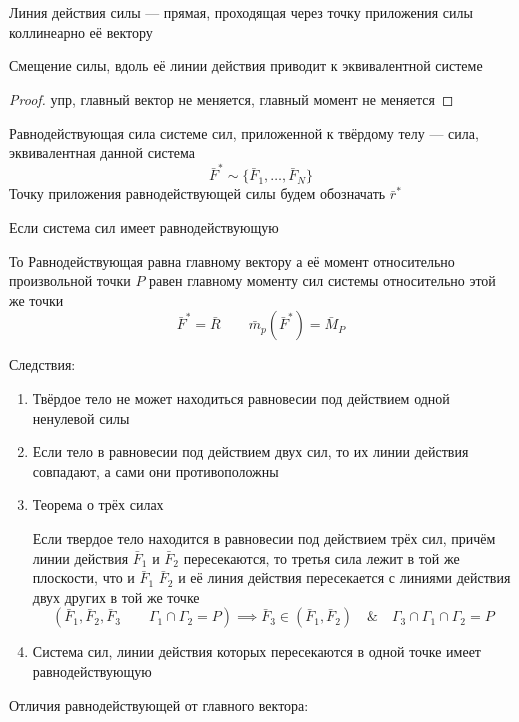 \documentclass[crop=false]{standalone}
\begin{document}
\section{}
\Def Линия действия силы — прямая, проходящая через точку приложения силы коллинеарно её вектору

\noindent \keypoint Смещение силы, вдоль её линии действия приводит к эквивалентной системе
\begin{proof}
    упр, главный вектор не меняется, главный момент не меняется
\end{proof}

\Def Равнодействующая сила системе сил, приложенной к твёрдому телу — сила, эквивалентная данной система
\[\bar F^* \sim \{\bar F_1 , \dots , \bar F_N\}\]
Точку приложения равнодействующей силы будем обозначать $\bar r^*$

\begin{theorem}[Вариньона]
Если система сил имеет равнодействующую

То Равнодействующая равна главному вектору а её момент относительно произвольной точки $P$ равен главному моменту сил системы относительно этой же точки
\[\bar F^* = \bar R \qquad \bar m_p(\bar F^*) = \bar M_P \]
\end{theorem}
Следствия:
\begin{enumerate}
    \item 
    Твёрдое тело не может находиться равновесии под действием одной ненулевой силы
    
    \item 
    Если тело в равновесии под действием двух сил, то их линии действия совпадают, а сами они противоположны
    
    \item Теорема о трёх силах
    
    Если твердое тело находится в равновесии под действием трёх сил, причём линии действия $\bar F_1$ и $\bar F_2$ пересекаются, то третья сила лежит в той же плоскости, что и $\bar F_1$ $\bar F_2$ и её линия действия пересекается с линиями действия двух других в той же точке
    \[(\bar F_1, \bar F_2, \bar F_3 \qquad \Gamma_1 \cap \Gamma_2 = P) \implies \bar F_3 \in (\bar F_1 , \bar F_2) \quad \& \quad \Gamma_3 \cap \Gamma_1 \cap \Gamma_2 = P\]
    
    \item Система сил, линии действия которых пересекаются в одной точке имеет равнодействующую
\end{enumerate}

\noindent \keypoint Отличия равнодействующей от главного вектора:
\end{document}
